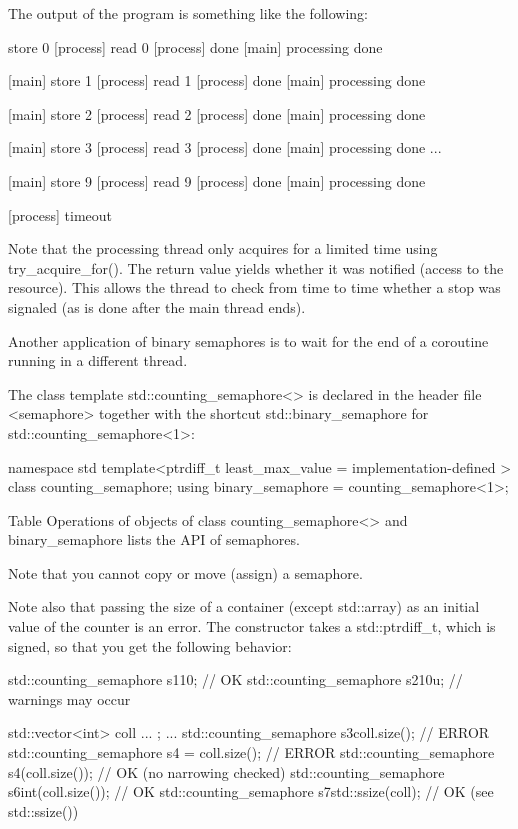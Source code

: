 The output of the program is something like the following:

\begin{shell}
[main] store 0
[process] read 0
[process]      done
[main] processing done

[main] store 1
[process] read 1
[process]      done
[main] processing done

[main] store 2
[process] read 2
[process]      done
[main] processing done

[main] store 3
[process] read 3
[process]      done
[main] processing done
...

[main] store 9
[process] read 9
[process]      done
[main] processing done

[process] timeout
\end{shell}

Note that the processing thread only acquires for a limited time using try\_acquire\_for(). The return value yields whether it was notified (access to the resource). This allows the thread to check from time to time whether a stop was signaled (as is done after the main thread ends).

Another application of binary semaphores is to wait for the end of a coroutine running in a different thread.


The class template std::counting\_semaphore<> is declared in the header file <semaphore> together with the shortcut std::binary\_semaphore for std::counting\_semaphore<1>:

\begin{cpp}
namespace std {
	template<ptrdiff_t least_max_value = implementation-defined >
	class counting_semaphore;
	using binary_semaphore = counting_semaphore<1>;
}
\end{cpp}

Table Operations of objects of class counting\_semaphore<> and binary\_semaphore lists the API of semaphores.

Note that you cannot copy or move (assign) a semaphore.

Note also that passing the size of a container (except std::array) as an initial value of the counter is an error. The constructor takes a std::ptrdiff\_t, which is signed, so that you get the following behavior:

\begin{cpp}
std::counting_semaphore s1{10}; // OK
std::counting_semaphore s2{10u}; // warnings may occur

std::vector<int> coll{ ... };
...
std::counting_semaphore s3{coll.size()}; // ERROR
std::counting_semaphore s4 = coll.size(); // ERROR
std::counting_semaphore s4(coll.size()); // OK (no narrowing checked)
std::counting_semaphore s6{int(coll.size())}; // OK
std::counting_semaphore s7{std::ssize(coll)}; // OK (see std::ssize())
\end{cpp}

